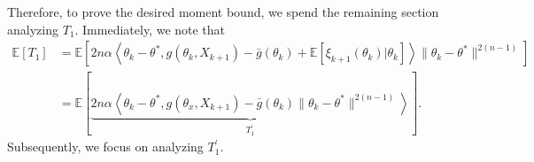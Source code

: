\documentclass[a4paper]{article}
\newcommand{\norm}[1]{\|#1 \|}
\newcommand{\Exs}{\mathbb{E}}
\newcommand{\thetastar}{\theta^*}
\newcommand{\stepsize}{\alpha}
\begin{document}
Therefore, to prove the desired moment bound, we spend the remaining section analyzing $T_{1}$. Immediately, we note that
\begin{align*}
	\Exs\left[T_{1}\right] &= \Exs\left[2n\stepsize \left\langle \theta_{k} - \thetastar, g\left(\theta_{k}, X_{k + 1}\right) - \bar{g}\left(\theta_{k}\right) + \Exs\left[\xi_{k + 1}\left(\theta_{k}\right) | \theta_{k}\right] \right\rangle\norm{\theta_{k} - \thetastar}^{2(n - 1)}\right]\\
	& = \Exs\left[\underbrace{2n\stepsize \left\langle \theta_{k} - \thetastar, g\left(\theta_{x}, X_{k + 1}\right) - \bar{g}\left(\theta_{k}\right)\norm{\theta_{k} - \thetastar}^{2(n - 1)}\right\rangle}_{T_{1}^{\prime}}\right].
\end{align*}
Subsequently, we focus on analyzing $T_{1}^{\prime}$.



\end{document}
